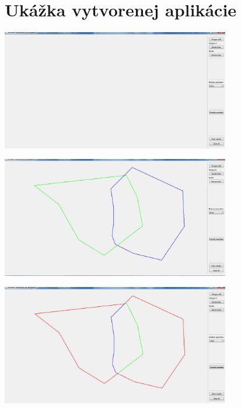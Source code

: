 \documentclass[12pt]{article}
\begin{document}

\section{Ukážka vytvorenej aplikácie}

\begin{center}
   \includegraphics[width=10cm]{./img/aplikacia1.png}
\end{center}

\begin{center}
   \includegraphics[width=10cm]{./img/aplikacia2.png}
\end{center}

\begin{center}
   \includegraphics[width=10cm]{./img/aplikacia_union.png}
\end{center}
\end{document}
